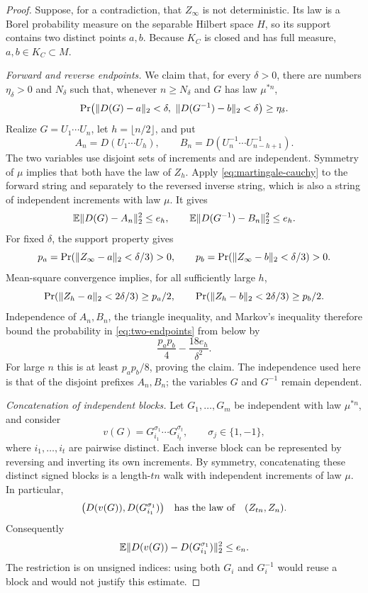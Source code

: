 \begin{proof}
Suppose, for a contradiction, that $Z_\infty$ is not deterministic.
Its law is a Borel probability measure on the separable Hilbert space
$H$, so its support contains two distinct points $a,b$.  Because
$K_C$ is closed and has full measure, $a,b\in K_C\subset M$.

\medskip\noindent
\emph{Forward and reverse endpoints.}
We claim that, for every $\delta>0$, there are numbers
$\eta_\delta>0$ and $N_\delta$ such that, whenever $n\ge N_\delta$
and $G$ has law $\mu^{*n}$,
\begin{equation}\label{eq:two-endpoints}
 \Pr\bigl(\lVert D(G)-a\rVert_2<\delta,
          \ \lVert D(G^{-1})-b\rVert_2<\delta\bigr)
 \ge\eta_\delta.
\end{equation}
Realize $G=U_1\cdots U_n$, let $h=\lfloor n/2\rfloor$, and put
\[
 A_n=D(U_1\cdots U_h),\qquad
 B_n=D(U_n^{-1}\cdots U_{n-h+1}^{-1}).
\]
The two variables use disjoint sets of increments and are independent.
Symmetry of $\mu$ implies that both have the law of $Z_h$.  Apply
\eqref{eq:martingale-cauchy} to the forward string and separately to
the reversed inverse string, which is also a string of independent
increments with law $\mu$.  It gives
\begin{equation}\label{eq:endpoint-replacement}
 \mathbb E\lVert D(G)-A_n\rVert_2^2\le e_h,
 \qquad
 \mathbb E\lVert D(G^{-1})-B_n\rVert_2^2\le e_h.
\end{equation}
For fixed $\delta$, the support property gives
\[
 p_a=\Pr(\lVert Z_\infty-a\rVert_2<\delta/3)>0,
 \qquad
 p_b=\Pr(\lVert Z_\infty-b\rVert_2<\delta/3)>0.
\]
Mean-square convergence implies, for all sufficiently large $h$,
\[
 \Pr(\lVert Z_h-a\rVert_2<2\delta/3)\ge p_a/2,
 \qquad
 \Pr(\lVert Z_h-b\rVert_2<2\delta/3)\ge p_b/2.
\]
Independence of $A_n,B_n$, the triangle inequality, and Markov's
inequality therefore bound the probability in
\eqref{eq:two-endpoints} from below by
\[
 \frac{p_ap_b}{4}-\frac{18e_h}{\delta^2}.
\]
For large $n$ this is at least $p_ap_b/8$, proving the claim.  The
independence used here is that of the disjoint prefixes $A_n,B_n$;
the variables $G$ and $G^{-1}$ remain dependent.

\medskip\noindent
\emph{Concatenation of independent blocks.}
Let $G_1,\ldots,G_m$ be independent with law $\mu^{*n}$, and consider
\[
 v(G)=G_{i_1}^{\sigma_1}\cdots G_{i_t}^{\sigma_t},
 \qquad \sigma_j\in\{1,-1\},
\]
where $i_1,\ldots,i_t$ are pairwise distinct.  Each inverse block can
be represented by reversing and inverting its own increments.  By
symmetry, concatenating these distinct signed blocks is a length-$tn$
walk with independent increments of law $\mu$.  In particular,
\[
 \bigl(D(v(G)),D(G_{i_1}^{\sigma_1})\bigr)
 \quad\hbox{has the law of}\quad (Z_{tn},Z_n).
\]
Consequently
\begin{equation}\label{eq:independent-blocks}
 \mathbb E\lVert D(v(G))-D(G_{i_1}^{\sigma_1})\rVert_2^2\le e_n.
\end{equation}
The restriction is on unsigned indices: using both $G_i$ and $G_i^{-1}$
would reuse a block and would not justify this estimate.


\end{proof}
